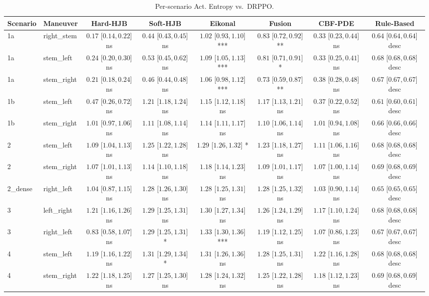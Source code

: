 \begin{table}[ht]
\centering
\caption{Per-scenario Act. Entropy vs.\ DRPPO.}
\label{tab:per_scenario_action_entropy_mean}
\begin{tabular}{llcccccc}
\toprule
Scenario & Maneuver & Hard-HJB & Soft-HJB & Eikonal & Fusion & CBF-PDE & Rule-Based \\
\midrule
1a & right_stem & $0.17$ [$0.14, 0.22$] ns & $0.44$ [$0.43, 0.45$] ns & $1.02$ [$0.93, 1.10$] *** & $0.83$ [$0.72, 0.92$] ** & $0.33$ [$0.23, 0.44$] ns & $0.64$ [$0.64, 0.64$] desc \\
1a & stem_left & $0.24$ [$0.20, 0.30$] ns & $0.53$ [$0.45, 0.62$] ns & $1.09$ [$1.05, 1.13$] *** & $0.81$ [$0.71, 0.91$] * & $0.33$ [$0.25, 0.41$] ns & $0.68$ [$0.68, 0.68$] desc \\
1a & stem_right & $0.21$ [$0.18, 0.24$] ns & $0.46$ [$0.44, 0.48$] ns & $1.06$ [$0.98, 1.12$] *** & $0.73$ [$0.59, 0.87$] ** & $0.38$ [$0.28, 0.48$] ns & $0.67$ [$0.67, 0.67$] desc \\
1b & stem_left & $0.47$ [$0.26, 0.72$] ns & $1.21$ [$1.18, 1.24$] ns & $1.15$ [$1.12, 1.18$] ns & $1.17$ [$1.13, 1.21$] ns & $0.37$ [$0.22, 0.52$] ns & $0.61$ [$0.60, 0.61$] desc \\
1b & stem_right & $1.01$ [$0.97, 1.06$] ns & $1.11$ [$1.08, 1.14$] ns & $1.14$ [$1.11, 1.17$] ns & $1.10$ [$1.06, 1.14$] ns & $1.01$ [$0.94, 1.08$] ns & $0.66$ [$0.66, 0.66$] desc \\
2 & stem_left & $1.09$ [$1.04, 1.13$] ns & $1.25$ [$1.22, 1.28$] ns & $1.29$ [$1.26, 1.32$] * & $1.23$ [$1.18, 1.27$] ns & $1.11$ [$1.06, 1.16$] ns & $0.68$ [$0.68, 0.68$] desc \\
2 & stem_right & $1.07$ [$1.01, 1.13$] ns & $1.14$ [$1.10, 1.18$] ns & $1.18$ [$1.14, 1.23$] ns & $1.09$ [$1.01, 1.17$] ns & $1.07$ [$1.00, 1.14$] ns & $0.69$ [$0.68, 0.69$] desc \\
2_dense & right_left & $1.04$ [$0.87, 1.15$] ns & $1.28$ [$1.26, 1.30$] ns & $1.28$ [$1.25, 1.31$] ns & $1.28$ [$1.25, 1.32$] ns & $1.03$ [$0.90, 1.14$] ns & $0.65$ [$0.65, 0.65$] desc \\
3 & left_right & $1.21$ [$1.16, 1.26$] ns & $1.29$ [$1.25, 1.31$] ns & $1.30$ [$1.27, 1.34$] ns & $1.26$ [$1.24, 1.29$] ns & $1.17$ [$1.10, 1.24$] ns & $0.68$ [$0.68, 0.68$] desc \\
3 & right_left & $0.83$ [$0.58, 1.07$] ns & $1.29$ [$1.25, 1.31$] * & $1.33$ [$1.30, 1.36$] *** & $1.19$ [$1.12, 1.25$] ns & $1.07$ [$0.86, 1.23$] ns & $0.67$ [$0.67, 0.67$] desc \\
4 & stem_left & $1.19$ [$1.16, 1.22$] ns & $1.31$ [$1.29, 1.34$] * & $1.31$ [$1.26, 1.36$] ns & $1.28$ [$1.25, 1.31$] ns & $1.22$ [$1.16, 1.28$] ns & $0.68$ [$0.68, 0.68$] desc \\
4 & stem_right & $1.22$ [$1.18, 1.25$] ns & $1.27$ [$1.25, 1.30$] ns & $1.28$ [$1.24, 1.32$] ns & $1.25$ [$1.22, 1.28$] ns & $1.18$ [$1.12, 1.23$] ns & $0.69$ [$0.68, 0.69$] desc \\
\bottomrule
\end{tabular}
\end{table}
